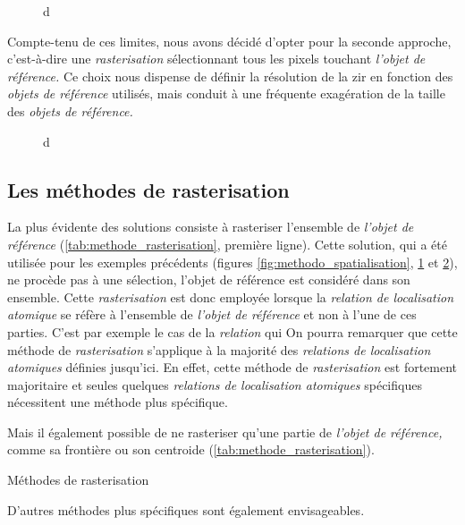 \begin{figure}
  \centering
  
  \caption{d}
  \label{fig:rasterisation_sel_pixels}
\end{figure}

Compte-tenu de ces limites, nous avons décidé d'opter pour la seconde approche, c'est-à-dire une \emph{rasterisation} sélectionnant tous les pixels touchant \emph{l'objet de référence.} Ce choix nous dispense de définir la résolution de la \ac{zir} en fonction des \emph{objets de référence} utilisés, mais conduit à une fréquente exagération de la taille des \emph{objets de référence.}

\begin{figure}
  \centering
  
  \caption{d}
  \label{fig:rasterisation_cas_limite}
\end{figure}

\subsection{Les méthodes de rasterisation}



La plus évidente des solutions consiste à rasteriser l'ensemble de \emph{l'objet de référence} (\autoref{tab:methode_rasterisation}, première ligne). Cette solution, qui a été utilisée pour les exemples précédents (\ie figures \ref{fig:methodo_spatialisation}, \ref{fig:rasterisation_sel_pixels} et \ref{fig:rasterisation_cas_limite}), ne procède pas à une sélection, l'objet de référence est considéré dans son ensemble.
%
Cette \emph{rasterisation} est donc employée lorsque la \emph{relation de localisation atomique} se réfère  à l'ensemble de \emph{l'objet de référence} et non à l'une de ces parties. C'est par exemple le cas de la \emph{relation}  qui
%
On pourra remarquer que cette méthode de \emph{rasterisation} s'applique à la majorité des \emph{relations de localisation atomiques} définies jusqu'ici. En effet, cette méthode de \emph{rasterisation} est fortement majoritaire et seules quelques \emph{relations de localisation atomiques} spécifiques nécessitent une méthode plus spécifique.




Mais il également possible de ne rasteriser qu'une partie de
\emph{l'objet de référence,} comme sa frontière ou son centroide
(\autoref{tab:methode_rasterisation}).

\begin{table}
  \centering
  
  \caption{Méthodes de rasterisation}
  \label{tab:methode_rasterisation}
\end{table}


D'autres méthodes plus spécifiques sont également envisageables.

